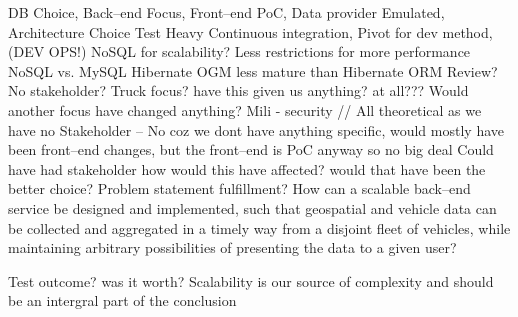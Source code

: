 DB Choice, Back--end Focus, Front--end PoC, Data provider Emulated,
Architecture Choice
Test Heavy
Continuous integration, Pivot for dev method,(DEV OPS!)
NoSQL for scalability?
Less restrictions for more performance
NoSQL vs. MySQL
Hibernate OGM less mature than Hibernate ORM
Review?
No stakeholder?
Truck focus? have this given us anything? at all???
Would another focus have changed anything? Mili - security // All theoretical as we have no Stakeholder -- No coz we dont have anything specific, would mostly have been front--end changes, but the front--end is PoC anyway so no big deal
Could have had stakeholder how would this have affected? would that have been the better choice?
Problem statement fulfillment?
How can a scalable back–end service be designed and implemented, such that geospatial
and vehicle data can be collected and aggregated in a timely way from a disjoint fleet
of vehicles, while maintaining arbitrary possibilities of presenting the data to a given user?

Test outcome? was it worth?
Scalability is our source of complexity and should be an intergral part of the conclusion
